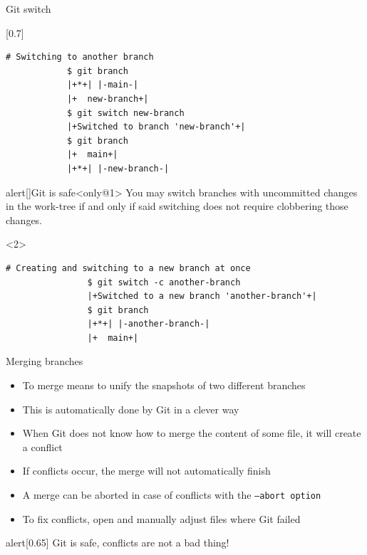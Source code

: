 \documentclass[usenames,svgnames,14pt]{beamer}
\begin{document}
\begin{frame}[fragile]{Git switch}
    \vspace{-8mm}
    \begin{overlayarea}{\textwidth}{0.8\textheight}
        \begin{varblock}{}[0.7\textwidth]{}
        \end{varblock}
        \begin{lstlisting}[style=MyBash]
            # Switching to another branch
            $ git branch
            |+*+| |-main-|
            |+  new-branch+|
            $ git switch new-branch
            |+Switched to branch 'new-branch'+|
            $ git branch
            |+  main+|
            |+*+| |-new-branch-|
        \end{lstlisting}
        \begin{varblock}{alert}[\textwidth]{Git is safe}<only@1>
            \small
            You may switch branches with uncommitted changes in the work-tree if and only if said switching does not require clobbering those changes.
        \end{varblock}
        \begin{onlyenv}<2>
            \begin{lstlisting}[style=MyBash]
                # Creating and switching to a new branch at once
                $ git switch -c another-branch
                |+Switched to a new branch 'another-branch'+|
                $ git branch
                |+*+| |-another-branch-|
                |+  main+|
            \end{lstlisting}
        \end{onlyenv}
    \end{overlayarea}
\end{frame}
\begin{frame}{Merging branches}
    \setlength{\leftmargini}{0.6cm}
    \begin{itemize}
        \item To merge means to unify the snapshots of two different branches
        \item This is automatically done by Git in a clever way
        \item When Git does not know how to merge the content of some file, it will create a conflict
        \item If conflicts occur, the merge will not automatically finish
        \item A merge can be aborted in case of conflicts with the \texttt{--abort option}
        \item To fix conflicts, open and manually adjust files where Git failed
    \end{itemize}
    \medskip
    \begin{varblock}{alert}[0.65\textwidth]{}
        \alert{Git is safe, conflicts are not a bad thing!}
    \end{varblock}
\end{frame}
\end{document}
